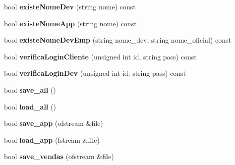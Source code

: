 \begin{DoxyCompactItemize}
\item 
\hypertarget{class_app_store_a3332b74ff7a7afea68b2834ffe1cdd58}{bool {\bfseries existe\+Nome\+Dev} (string nome) const }\label{class_app_store_a3332b74ff7a7afea68b2834ffe1cdd58}

\item 
\hypertarget{class_app_store_a2d4c84aab2fdbbfb28f53f17a40fb2ff}{bool {\bfseries existe\+Nome\+App} (string nome) const }\label{class_app_store_a2d4c84aab2fdbbfb28f53f17a40fb2ff}

\item 
\hypertarget{class_app_store_a955c333e245cc31226c60d17d04254c6}{bool {\bfseries existe\+Nome\+Dev\+Emp} (string nome\+\_\+dev, string nome\+\_\+oficial) const }\label{class_app_store_a955c333e245cc31226c60d17d04254c6}

\item 
\hypertarget{class_app_store_a3e8ce8e16ba9ff688af3604da47aceed}{bool {\bfseries verifica\+Login\+Cliente} (unsigned int id, string pass) const }\label{class_app_store_a3e8ce8e16ba9ff688af3604da47aceed}

\item 
\hypertarget{class_app_store_aafe13636e2785b91c770cb39c590dddf}{bool {\bfseries verifica\+Login\+Dev} (unsigned int id, string pass) const }\label{class_app_store_aafe13636e2785b91c770cb39c590dddf}

\item 
\hypertarget{class_app_store_a6f08f038a3407eac967198bb2c66d503}{bool {\bfseries save\+\_\+all} ()}\label{class_app_store_a6f08f038a3407eac967198bb2c66d503}

\item 
\hypertarget{class_app_store_a57a6ca1ab540c2670b92987252bee1b9}{bool {\bfseries load\+\_\+all} ()}\label{class_app_store_a57a6ca1ab540c2670b92987252bee1b9}

\item 
\hypertarget{class_app_store_a12ab54d48ce4d709971823127eb92408}{bool {\bfseries save\+\_\+app} (ofstream \&file)}\label{class_app_store_a12ab54d48ce4d709971823127eb92408}

\item 
\hypertarget{class_app_store_a4b4a37404b10df2303a8f95d6c2697b4}{bool {\bfseries load\+\_\+app} (fstream \&file)}\label{class_app_store_a4b4a37404b10df2303a8f95d6c2697b4}

\item 
\hypertarget{class_app_store_a9bf71a93e0c065796e07a387b593801e}{bool {\bfseries save\+\_\+vendas} (ofstream \&file)}\label{class_app_store_a9bf71a93e0c065796e07a387b593801e}


\end{DoxyCompactItemize}
